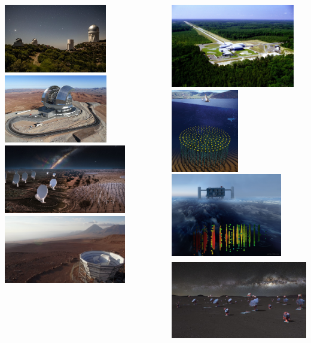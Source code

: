 \documentclass[aspectratio=169, handout]{beamer}
\begin{document}
\begin{frame}
\begin{columns}
        \includegraphics[height=0.15183\textwidth]{figures/telescopes/desi.jpg}%
        \includegraphics[height=0.15183\textwidth]{figures/telescopes/eelt.jpg}%
        \includegraphics[height=0.15183\textwidth]{figures/telescopes/ska.jpg}%
        \includegraphics[height=0.15183\textwidth]{figures/telescopes/SO.jpg}%
        \vspace{-1pt}

        \includegraphics[height=0.18428\textwidth]{figures/telescopes/ligo.jpg}%
        \includegraphics[height=0.18428\textwidth]{figures/telescopes/km3n.jpg}%
        \includegraphics[height=0.18428\textwidth]{figures/telescopes/icecube.jpg}%
        \includegraphics[height=0.18428\textwidth]{figures/telescopes/CTA.jpg}%


\end{columns}
\end{frame}
\end{document}
